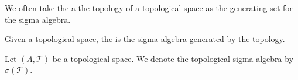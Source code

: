 \sbasic


\sstart



We often take the a the
topology of a topological
space as the generating
set for the sigma algebra.


Given a topological space, the
is the sigma algebra generated
by the topology.


Let $(A, \mathcal{T})$ be a topological space.
We denote the
topological sigma algebra
by $\sigma(\mathcal{T})$.

\strats
